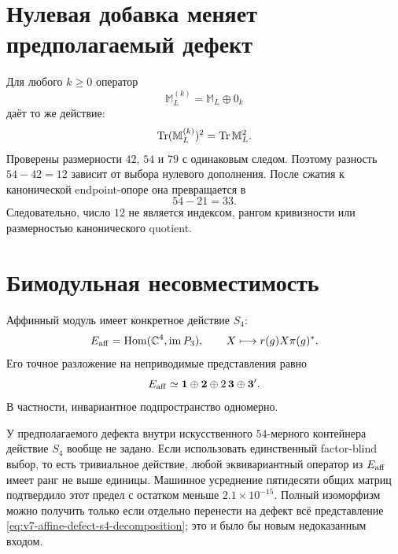 \section{Нулевая добавка меняет предполагаемый дефект}

Для любого $k\ge0$ оператор
\begin{equation}
 \mathbb M_L^{(k)}=\mathbb M_L\oplus0_k
\end{equation}
даёт то же действие:
\begin{equation}
 \operatorname{Tr}(\mathbb M_L^{(k)})^2=\operatorname{Tr}\mathbb M_L^2.
 \label{eq:v7-affine-defect-zero-padding}
\end{equation}
Проверены размерности $42$, $54$ и $79$ с одинаковым следом. Поэтому
разность $54-42=12$ зависит от выбора нулевого дополнения. После сжатия к
канонической endpoint-опоре она превращается в
\begin{equation}
 54-21=33.
 \label{eq:v7-affine-defect-support-difference}
\end{equation}
Следовательно, число $12$ не является индексом, рангом кривизности или
размерностью канонического quotient.

\section{Бимодульная несовместимость}

Аффинный модуль имеет конкретное действие $S_4$:
\begin{equation}
 E_{\rm aff}=\operatorname{Hom}(\mathbb C^4,\operatorname{im}P_3),
 \qquad X\longmapsto r(g)X\pi(g)^*.
\end{equation}
Его точное разложение на неприводимые представления равно
\begin{equation}
 E_{\rm aff}\simeq
 \mathbf1\oplus\mathbf2\oplus2\,\mathbf3\oplus\mathbf3'.
 \label{eq:v7-affine-defect-s4-decomposition}
\end{equation}
В частности, инвариантное подпространство одномерно.

У предполагаемого дефекта внутри искусственного $54$-мерного контейнера
действие $S_4$ вообще не задано. Если использовать единственный
factor-blind выбор, то есть тривиальное действие, любой эквивариантный
оператор из $E_{\rm aff}$ имеет ранг не выше единицы. Машинное усреднение
пятидесяти общих матриц подтвердило этот предел с остатком меньше
$2.1\times10^{-15}$. Полный изоморфизм можно получить только если отдельно
перенести на дефект всё представление \eqref{eq:v7-affine-defect-s4-decomposition};
это и было бы новым недоказанным входом.

